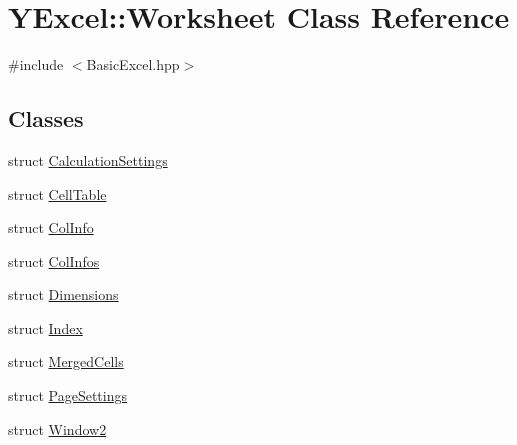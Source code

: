\hypertarget{class_y_excel_1_1_worksheet}{}\section{Y\+Excel\+:\+:Worksheet Class Reference}
\label{class_y_excel_1_1_worksheet}


{\ttfamily \#include $<$Basic\+Excel.\+hpp$>$}

\subsection*{Classes}
\begin{DoxyCompactItemize}
\item 
struct \hyperlink{struct_y_excel_1_1_worksheet_1_1_calculation_settings}{Calculation\+Settings}
\item 
struct \hyperlink{struct_y_excel_1_1_worksheet_1_1_cell_table}{Cell\+Table}
\item 
struct \hyperlink{struct_y_excel_1_1_worksheet_1_1_col_info}{Col\+Info}
\item 
struct \hyperlink{struct_y_excel_1_1_worksheet_1_1_col_infos}{Col\+Infos}
\item 
struct \hyperlink{struct_y_excel_1_1_worksheet_1_1_dimensions}{Dimensions}
\item 
struct \hyperlink{struct_y_excel_1_1_worksheet_1_1_index}{Index}
\item 
struct \hyperlink{struct_y_excel_1_1_worksheet_1_1_merged_cells}{Merged\+Cells}
\item 
struct \hyperlink{struct_y_excel_1_1_worksheet_1_1_page_settings}{Page\+Settings}
\item 
struct \hyperlink{struct_y_excel_1_1_worksheet_1_1_window2}{Window2}
\end{DoxyCompactItemize}
